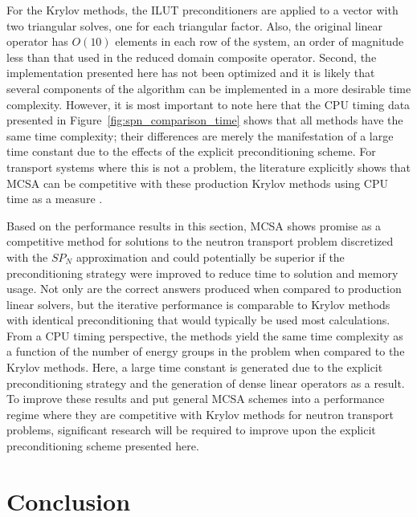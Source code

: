 \documentclass[letterpaper,11pt]{article}
\begin{document}
For the Krylov methods, the ILUT preconditioners are applied to a
vector with two triangular solves, one for each triangular
factor. Also, the original linear operator has $O(10)$ elements in
each row of the system, an order of magnitude less than that used in
the reduced domain composite operator. Second, the implementation
presented here has not been optimized and it is likely that several
components of the algorithm can be implemented in a more desirable
time complexity. However, it is most important to note here that the
CPU timing data presented in Figure~\ref{fig:spn_comparison_time}
shows that all methods have the same time complexity; their
differences are merely the manifestation of a large time constant due
to the effects of the explicit preconditioning scheme. For transport
systems where this is not a problem, the literature explicitly shows
that MCSA can be competitive with these production Krylov methods
using CPU time as a measure \cite{evans_monte_2012}.

Based on the performance results in this section, MCSA shows promise
as a competitive method for solutions to the neutron transport problem
discretized with the $SP_N$ approximation and could potentially be
superior if the preconditioning strategy were improved to reduce time
to solution and memory usage. Not only are the correct answers
produced when compared to production linear solvers, but the iterative
performance is comparable to Krylov methods with identical
preconditioning that would typically be used most calculations. From a
CPU timing perspective, the methods yield the same time complexity as
a function of the number of energy groups in the problem when compared
to the Krylov methods. Here, a large time constant is generated due to
the explicit preconditioning strategy and the generation of dense
linear operators as a result. To improve these results and put general
MCSA schemes into a performance regime where they are competitive with
Krylov methods for neutron transport problems, significant research
will be required to improve upon the explicit preconditioning scheme
presented here.

\section{Conclusion}
\label{sec:conclusion}
\end{document}
